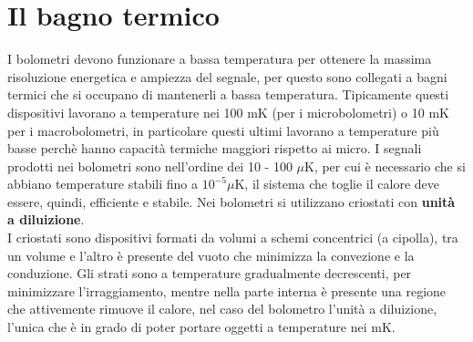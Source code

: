 \section{Il bagno termico}
I bolometri devono funzionare a bassa temperatura per ottenere la massima risoluzione energetica e ampiezza del segnale, per questo
sono collegati a bagni termici che si occupano di mantenerli a bassa temperatura.
Tipicamente questi dispositivi lavorano a temperature nei 100 mK (per i microbolometri) o 10 mK per i macrobolometri, in particolare
questi ultimi lavorano a temperature pi\`u basse perch\`e hanno capacit\`a termiche maggiori rispetto ai micro.
I segnali prodotti nei bolometri sono nell'ordine dei 10 - 100 $\mu$K, per cui \`e necessario che si abbiano temperature stabili fino a $10^{-5} \mu$K,
il sistema che toglie il calore deve essere, quindi, efficiente e stabile.
Nei bolometri si utilizzano criostati con \textbf{unit\`a a diluizione}.\\
I criostati sono dispositivi formati da volumi a schemi concentrici (a cipolla), tra un volume e l'altro \`e presente del vuoto che minimizza
la convezione e la conduzione. 
Gli strati sono a temperature gradualmente decrescenti, per minimizzare l'irraggiamento, mentre nella parte interna \`e presente una regione
che attivemente rimuove il calore, nel caso del bolometro l'unit\`a a diluizione, l'unica che \`e in grado di poter portare oggetti a temperature
nei mK.
